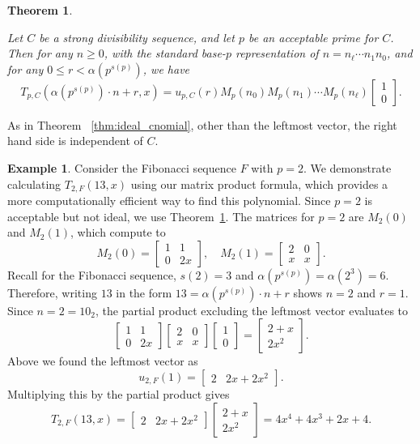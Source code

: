 \documentclass{amsart}
\newtheorem{theorem}{Theorem}
\theoremstyle{definition}
\newtheorem*{example*}{Example}
\begin{document}
\begin{theorem}\label{thm:acceptable_cnomial}

Let $ C $ be a strong divisibility sequence, and let $ p $ be an acceptable prime for $ C $. Then for any $ n \geq 0 $, with the standard base-$p$ representation of $n = n_{\ell}\cdots n_1n_0$, and for any $ 0 \leq r < \alpha(p^{s(p)}) $, we have 
\[
T_{p,C}(\alpha(p^{s(p)}) \cdot n + r, x)
= u_{p,C}(r) M_p(n_0) M_p(n_1) \cdots M_p(n_\ell) \begin{bmatrix} 1 \\ 0 \end{bmatrix}.
\]
\end{theorem}
As in Theorem ~\ref{thm:ideal_cnomial}, other than the leftmost vector, the right hand side is independent of $C$.
\begin{example*}
Consider the Fibonacci sequence $F$ with $p=2$. We demonstrate calculating $T_{2,F}(13, x)$ using our matrix product formula, which provides a more computationally efficient way to find this polynomial. Since $p = 2$ is acceptable but not ideal, we use Theorem~\ref{thm:acceptable_cnomial}. The matrices for $p=2$ are $M_2(0)$ and $M_2(1)$, which compute to $$M_2(0)=\begin{bmatrix}1&1\\0&2x\end{bmatrix},\quad 
M_2(1)=\begin{bmatrix}2&0\\x&x\end{bmatrix}.
$$ Recall for the Fibonacci sequence, $s(2)=3$ and $\alpha(p^{s(p)})=\alpha(2^3)=6$. Therefore, writing $13$ in the form $13=\alpha(p^{s(p)})\cdot n+r$ shows $n=2$ and $r=1$. Since $n=2=10_2$, the partial product excluding the leftmost vector evaluates to $$\begin{bmatrix}1&1\\0&2x\end{bmatrix}\begin{bmatrix}2&0\\x&x\end{bmatrix}\begin{bmatrix}1\\0\end{bmatrix}=\begin{bmatrix}2+x\\2x^2\end{bmatrix}.$$ 
Above we found the leftmost vector as $$u_{2,F}(1)=\begin{bmatrix}
    2&2x+2x^2
\end{bmatrix}.$$
Multiplying this by the partial product gives $$T_{2,F}(13,x) =\begin{bmatrix}
    2&2x+2x^2
\end{bmatrix}\begin{bmatrix}2+x\\2x^2\end{bmatrix}=4x^4+4x^3+2x+4.$$ 


\end{example*}
\end{document}
